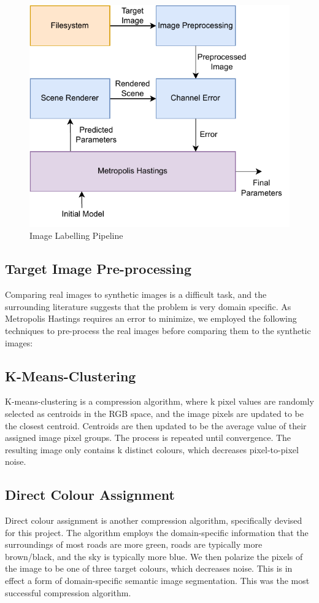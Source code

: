 \documentclass[conference]{IEEEtran}
\begin{document}
\begin{figure}[h]
    \centering
    \includegraphics[width=\linewidth]{images/pipeline.drawio.pdf}
    \caption{Image Labelling Pipeline}
    \label{fig:pipeline}
\end{figure}

\subsection*{Target Image Pre-processing}
Comparing real images to synthetic images is a difficult task, and the surrounding literature suggests that the problem is very domain specific. As Metropolis Hastings requires an error to minimize, we employed the following techniques to pre-process the real images before comparing them to the synthetic images:
\subsection*{K-Means-Clustering}
K-means-clustering is a compression algorithm, where k pixel values are randomly selected as centroids in the RGB space, and the image pixels are updated to be the closest centroid. Centroids are then updated to be the average value of their assigned image pixel groups. The process is repeated until convergence. The resulting image only contains k distinct colours, which decreases pixel-to-pixel noise.
\subsection*{Direct Colour Assignment}
Direct colour assignment is another compression algorithm, specifically devised for this project. The algorithm employs the domain-specific information that the surroundings of most roads are more green, roads are typically more brown/black, and the sky is typically more blue. We then polarize the pixels of the image to be one of three target colours, which decreases noise. This is in effect a form of domain-specific semantic image segmentation. This was the most successful compression algorithm. 
\end{document}
